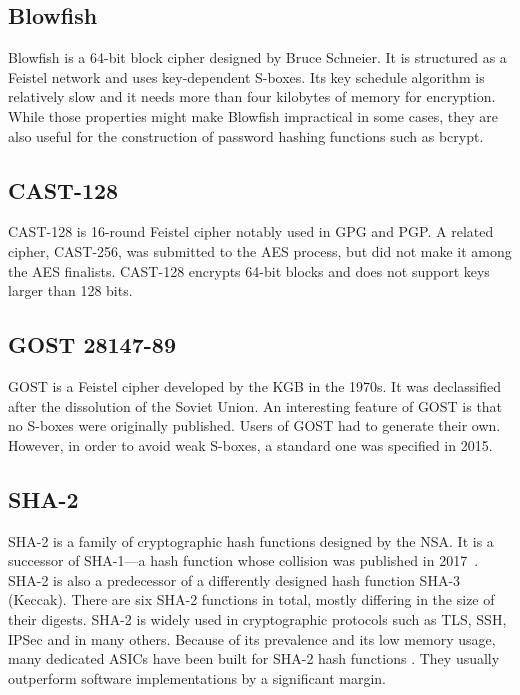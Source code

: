 \documentclass[thesis=B,english]{FITthesis}[2012/10/20]
\begin{document}
	\subsection{Blowfish}
	
	Blowfish \cite{blowfish} is a 64-bit block cipher designed by Bruce Schneier. It is structured as a Feistel network and uses key-dependent S-boxes. Its key schedule algorithm is relatively slow and it needs more than four kilobytes of memory for encryption. While those properties might make Blowfish impractical in some cases, they are also useful for the construction of password hashing functions such as bcrypt. 
	
	\subsection{CAST-128}
	
	CAST-128 \cite{cast128} is 16-round Feistel cipher notably used in GPG and PGP. A related cipher, CAST-256, was submitted to the AES process, but did not make it among the AES finalists. CAST-128 encrypts 64-bit blocks and does not support keys larger than 128 bits.
	
	\subsection{GOST 28147-89}
	
	GOST \cite{gost} is a Feistel cipher developed by the KGB in the 1970s. It was declassified after the dissolution of the Soviet Union. An interesting feature of GOST is that no S-boxes were originally published. Users of GOST had to generate their own. However, in order to avoid weak S-boxes, a standard one was specified in 2015. 
	
	\subsection{SHA-2}
	
	SHA-2 \cite{sha2} is a family of cryptographic hash functions designed by the NSA. It is a successor of SHA-1---a hash function whose collision was published in 2017~\cite{shattered}. SHA-2 is also a predecessor of a differently designed hash function SHA-3 (Keccak). There are six SHA-2 functions in total, mostly differing in the size of their digests. SHA-2 is widely used in cryptographic protocols such as TLS, SSH, IPSec and in many others. Because of its prevalence and its low memory usage, many dedicated ASICs have been built for SHA-2 hash functions \cite{sha_asic}. They usually outperform software implementations by a significant margin.
	
\end{document}
